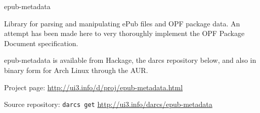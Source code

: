 \begin{hcarentry}{epub-metadata}
\makeheader

Library for parsing and manipulating ePub files and OPF package data. An attempt has been made here to very thoroughly implement the OPF Package Document specification.

epub-metadata is available from Hackage, the darcs repository below, and also in binary form for Arch Linux through the AUR.

\FurtherReading
\begin{compactitem}
\item Project page:
\url{http://ui3.info/d/proj/epub-metadata.html}

\item Source repository:
\texttt{darcs get} \url{http://ui3.info/darcs/epub-metadata}
\end{compactitem}
\end{hcarentry}
